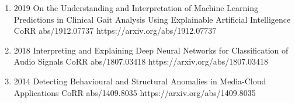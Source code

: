 \documentclass[10pt,a4paper]{article} %
\begin{document}
{\begin{enumerate}
        \item[] 
                            {2019}
                            {On the Understanding and Interpretation of Machine Learning Predictions in Clinical Gait Analysis Using Explainable Artificial Intelligence}
                            {CoRR abs/1912.07737}
                            {https://arxiv.org/abs/1912.07737}

        \item[] 
                            {2018}
                            {Interpreting and Explaining Deep Neural Networks for Classification of Audio Signals}
                            {CoRR abs/1807.03418}
                            {https://arxiv.org/abs/1807.03418}

        \item[] 
                            {2014}
                            {Detecting Behavioural and Structural Anomalies in Media-Cloud Applications}
                            {CoRR abs/1409.8035}
                            {https://arxiv.org/abs/1409.8035}

    \end{enumerate}

}
\end{document}
